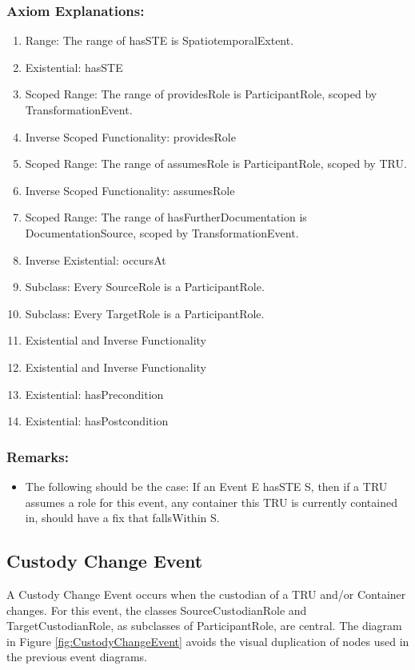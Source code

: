 \subsubsection*{Axiom Explanations:}
\begin{enumerate}
    \item Range: The range of \textsf{hasSTE} is \textsf{SpatiotemporalExtent}.
    \item Existential: \textsf{hasSTE}
    \item Scoped Range: The range of \textsf{providesRole} is \textsf{ParticipantRole}, scoped by \textsf{TransformationEvent}.
    \item Inverse Scoped Functionality: \textsf{providesRole}
    \item Scoped Range: The range of \textsf{assumesRole} is \textsf{ParticipantRole}, scoped by \textsf{TRU}.
    \item Inverse Scoped Functionality: \textsf{assumesRole}
    \item Scoped Range: The range of \textsf{hasFurtherDocumentation} is \textsf{DocumentationSource}, scoped by \textsf{TransformationEvent}.
    \item Inverse Existential: \textsf{occursAt}
    \item Subclass: Every \textsf{SourceRole} is a \textsf{ParticipantRole}.
    \item Subclass: Every \textsf{TargetRole} is a \textsf{ParticipantRole}.
    \item Existential and Inverse Functionality
    \item Existential and Inverse Functionality
    \item Existential: \textsf{hasPrecondition}
    \item Existential: \textsf{hasPostcondition}
\end{enumerate}

\subsubsection{Remarks:}
\begin{itemize}
    \item The following should be the case: If an Event E hasSTE S, then if a TRU assumes a role for this event, any container this TRU is currently contained in, should have a fix that fallsWithin S.
\end{itemize}

\subsection{Custody Change Event}
\label{ssec:custody}
A Custody Change Event occurs when the custodian of a TRU and/or Container changes. For this event, the classes SourceCustodianRole and TargetCustodianRole, as subclasses of ParticipantRole, are central. The diagram in Figure \ref{fig:CustodyChangeEvent} avoids the visual duplication of nodes used in the previous event diagrams.

